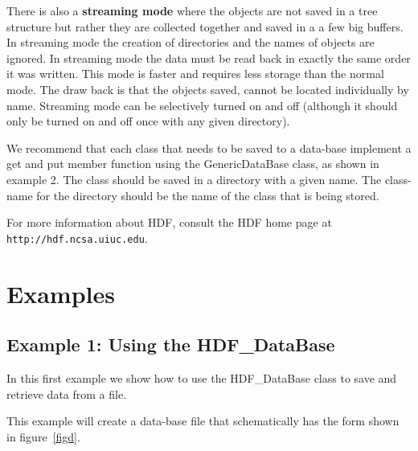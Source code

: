 There is also a {\bf streaming mode} where the objects are not saved in a tree structure 
but rather they are collected together and saved in a a few big buffers. In streaming mode 
the creation of directories and the names of objects are ignored.  In streaming mode the
data must be read back in exactly the same order it was written. This mode is faster and
requires less storage than the normal mode. The draw back is that the objects saved,
cannot be located individually by name. Streaming mode can be selectively turned on and off 
(although it should only be turned on and off once with any given directory).


We recommend that each class that needs to be saved to a data-base
implement a {\ff get} and {\ff put} member function using the {\ff
GenericDataBase} class, as shown in example 2.  The class should be
saved in a directory with a given name. The class-name for the
directory should be the name of the class that is being stored.


For more information about HDF, consult the HDF home page at {\tt http://hdf.ncsa.uiuc.edu}.

\vfill\eject
\section{Examples}

\subsection{Example 1: Using the HDF\_DataBase}

In this first example we show how to use the {\ff HDF\_DataBase} class to
save and retrieve data from a file.


This example will create a data-base file that schematically 
has the form shown in figure~\ref{figd}.


